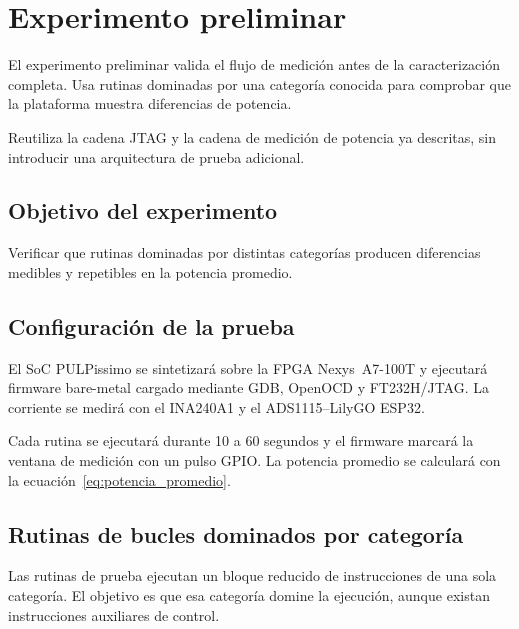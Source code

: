 \chapter{Experimento preliminar}
\label{ch:experimento}

El experimento preliminar valida el flujo de medición antes de la caracterización completa. Usa rutinas dominadas por una categoría conocida para comprobar que la plataforma muestra diferencias de potencia.

Reutiliza la cadena JTAG y la cadena de medición de potencia ya descritas, sin introducir una arquitectura de prueba adicional. 

\section{Objetivo del experimento}
\label{sec:objetivo_experimento}

Verificar que rutinas dominadas por distintas categorías producen diferencias medibles y repetibles en la potencia promedio. 

\section{Configuración de la prueba}
\label{sec:configuracion_experimento}

El SoC PULPissimo se sintetizará sobre la FPGA Nexys~A7-100T y ejecutará firmware bare-metal cargado mediante GDB, OpenOCD y FT232H/JTAG. La corriente se medirá con el INA240A1 y el ADS1115--LilyGO ESP32.

Cada rutina se ejecutará durante 10 a 60 segundos y el firmware marcará la ventana de medición con un pulso GPIO. La potencia promedio se calculará con la ecuación~\ref{eq:potencia_promedio}.

\section{Rutinas de bucles dominados por categoría}
\label{sec:bucles_homogeneos_preliminares}

Las rutinas de prueba ejecutan un bloque reducido de instrucciones de una sola categoría. El objetivo es que esa categoría domine la ejecución, aunque existan instrucciones auxiliares de control.

